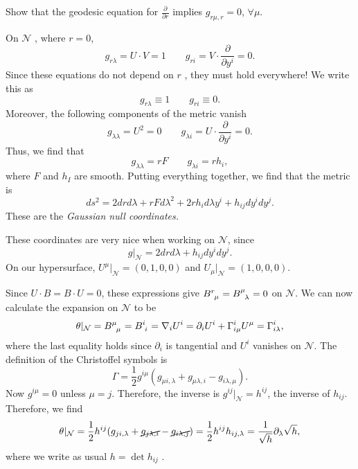 \begin{exercise}
  Show that the geodesic equation for $\frac{\partial }{\partial r}$  implies $g_{r\mu, r} = 0$, $\forall \mu$.
\end{exercise}

On $\mathcal{N}$ , where  $r = 0$,
\begin{equation}
  g_{r\lambda} = U \cdot V = 1 \qquad g_{ri} = V \cdot \frac{\partial }{\partial y^{i}} = 0.
\end{equation} 
Since these equations do not depend on $r$ , they must hold everywhere! We write this as
\begin{equation}
  g_{r\lambda} \equiv 1 \qquad g_{ri} \equiv 0.
\end{equation}
Moreover, the following components of the metric vanish
\begin{equation}
  g_{\lambda\lambda} = U^2 = 0 \qquad g_{\lambda i} = U \cdot \frac{\partial }{\partial y^{i}} = 0.
\end{equation}
Thus, we find that 
\begin{equation}
  g_{\lambda\lambda} = r F \qquad g_{\lambda i} = r h_i, 
\end{equation}
where $F$ and $h_I$ are smooth.
Putting everything together, we find that the metric is
\begin{equation}
  ds^2 = 2 dr d\lambda + r F d\lambda^2 + 2 r h_i d \lambda y^{i} + h_{ij} d y^{i} dy^{j}.
\end{equation}
These are the \emph{Gaussian null coordinates.}

These coordinates are very nice when working on $\mathcal{N}$, since
\begin{equation}
  g \rvert_\mathcal{N} = 2 dr d\lambda + h_{ij} dy^{i} dy^{j}.
\end{equation}
On our hypersurface, $U^{\mu}\rvert_\mathcal{N} = (0,1,0,0)$ and $U_{\mu}\rvert_\mathcal{N} = (1,0,0,0)$.

Since $U \cdot B = B \cdot U = 0$, these expressions give $B\indices{^{r}_{\mu}} = B\indices{^{\mu}_{\lambda}} = 0$ on $\mathcal{N}$.
We can now calculate the expansion on $\mathcal{N}$ to be
\begin{equation}
  \theta\rvert_{\mathcal{N}} = B\indices{^{\mu}_{\mu}} = B\indices{^{i}_{i}} = \nabla_i U^{i} = \partial_{i} U^{i} + \Gamma^{i}_{i \mu} U^{\mu} = \Gamma^{i}_{i\lambda},
\end{equation}
where the last equality holds since $\partial_{i}$ is tangential and $U^i$ vanishes on $\mathcal{N}$.
The definition of the Christoffel symbols is 
\begin{equation}
  \Gamma = \frac{1}{2} g^{i\mu} (g_{\mu i , \lambda} + g_{\mu\lambda, i} - g_{i \lambda, \mu}).
\end{equation}
Now $g^{i \mu} = 0$ unless $\mu = j$. Therefore, the inverse is $g^{ij} \rvert_\mathcal{N} = h^{ij}$, the inverse of $h_{ij}$.
Therefore, we find
\begin{equation}
  \theta\rvert_\mathcal{N} = \frac{1}{2} h^{ij} (g_{ji, \lambda} + \cancel{g_{j\lambda, i}} - \cancel{g_{i\lambda, j}}) = \frac{1}{2} h^{ij} h_{ij, \lambda} = \frac{1}{\sqrt{h}} \partial_{\lambda} \sqrt{h}, 
\end{equation}
where we write as usual $h = \det h_{ij}$ .

